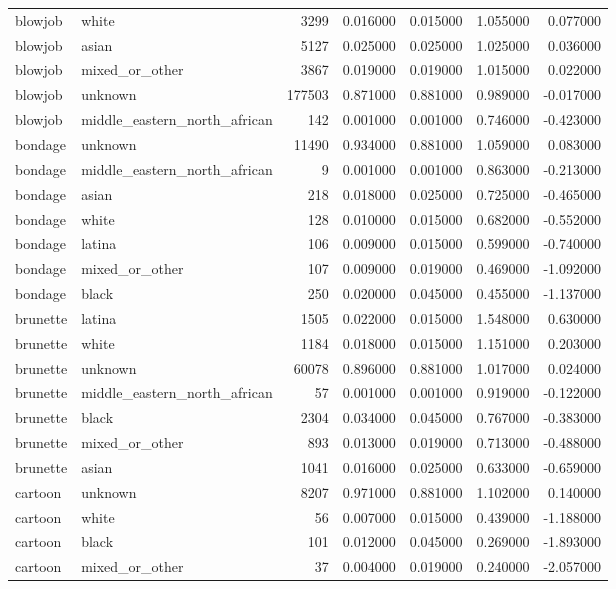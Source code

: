 \begin{tabular}{llrrrrr}
blowjob & white & 3299 & 0.016000 & 0.015000 & 1.055000 & 0.077000 \\
blowjob & asian & 5127 & 0.025000 & 0.025000 & 1.025000 & 0.036000 \\
blowjob & mixed_or_other & 3867 & 0.019000 & 0.019000 & 1.015000 & 0.022000 \\
blowjob & unknown & 177503 & 0.871000 & 0.881000 & 0.989000 & -0.017000 \\
blowjob & middle_eastern_north_african & 142 & 0.001000 & 0.001000 & 0.746000 & -0.423000 \\
bondage & unknown & 11490 & 0.934000 & 0.881000 & 1.059000 & 0.083000 \\
bondage & middle_eastern_north_african & 9 & 0.001000 & 0.001000 & 0.863000 & -0.213000 \\
bondage & asian & 218 & 0.018000 & 0.025000 & 0.725000 & -0.465000 \\
bondage & white & 128 & 0.010000 & 0.015000 & 0.682000 & -0.552000 \\
bondage & latina & 106 & 0.009000 & 0.015000 & 0.599000 & -0.740000 \\
bondage & mixed_or_other & 107 & 0.009000 & 0.019000 & 0.469000 & -1.092000 \\
bondage & black & 250 & 0.020000 & 0.045000 & 0.455000 & -1.137000 \\
brunette & latina & 1505 & 0.022000 & 0.015000 & 1.548000 & 0.630000 \\
brunette & white & 1184 & 0.018000 & 0.015000 & 1.151000 & 0.203000 \\
brunette & unknown & 60078 & 0.896000 & 0.881000 & 1.017000 & 0.024000 \\
brunette & middle_eastern_north_african & 57 & 0.001000 & 0.001000 & 0.919000 & -0.122000 \\
brunette & black & 2304 & 0.034000 & 0.045000 & 0.767000 & -0.383000 \\
brunette & mixed_or_other & 893 & 0.013000 & 0.019000 & 0.713000 & -0.488000 \\
brunette & asian & 1041 & 0.016000 & 0.025000 & 0.633000 & -0.659000 \\
cartoon & unknown & 8207 & 0.971000 & 0.881000 & 1.102000 & 0.140000 \\
cartoon & white & 56 & 0.007000 & 0.015000 & 0.439000 & -1.188000 \\
cartoon & black & 101 & 0.012000 & 0.045000 & 0.269000 & -1.893000 \\
cartoon & mixed_or_other & 37 & 0.004000 & 0.019000 & 0.240000 & -2.057000 \\

\end{tabular}
